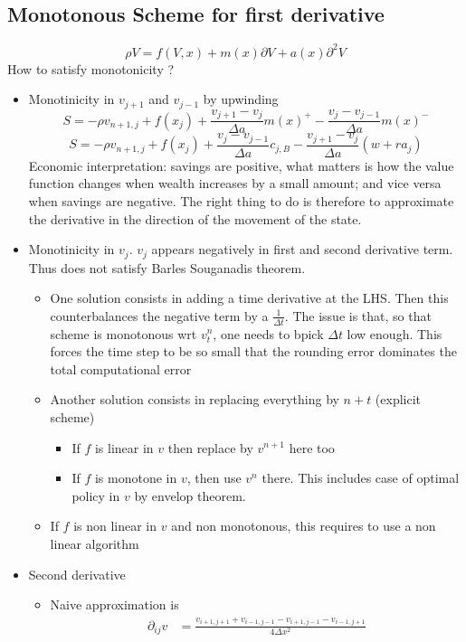 \documentclass[english]{article}
\begin{document}
\subsection{Monotonous Scheme for first derivative}
$$\rho V = f(V, x) + m(x) \partial V + a(x) \partial^2V$$ 
How to satisfy monotonicity ?
\begin{itemize}
	\item Monotinicity in $v_{j+1}$ and $v_{j-1}$ by upwinding
	$$S =-\rho v_{n+1, j} + f(x_j) + \frac{v_{j+1}-v_{j}}{\Delta a} m(x)^+ - \frac{v_j-v_{j-1}}{\Delta a} m(x)^-$$
	$$S =-\rho v_{n+1, j} + f(x_j) + \frac{v_j-v_{j-1}}{\Delta a} c_{j, B} - \frac{v_{j+1}-v_j}{\Delta a} (w + ra_j)$$
	Economic interpretation:  savings are positive, what matters is how the value function changes when wealth increases by a small amount; and vice versa when savings are negative. The right thing to do is therefore to approximate the derivative in the direction of the movement of the state.
	\item Monotinicity in $v_{j}$. $v_j$ appears negatively in first and second derivative term. Thus does not satisfy Barles Souganadis theorem.
	\begin{itemize}
		\item One solution consists in adding a time derivative at the LHS. Then this counterbalances the negative term by a $\frac{1}{\Delta t}$. 
		The issue is that, so that scheme is monotonous wrt $v^n_t$, one needs to bpick $\Delta t$ low enough. This forces the time step to be so small	that the rounding error dominates the total computational error
		\item Another solution consists in replacing everything by $n+t$ (explicit scheme)
		\begin{itemize}
			\item If $f$ is linear in $v$ then replace by $v^{n+1}$ here too
			\item If $f$ is monotone in $v$, then use $v^n$ there. This includes case of optimal policy in $v$ by envelop theorem.
		\end{itemize}
		\item If $f$ is non linear in $v$ and non monotonous, this requires to use a non linear algorithm
	\end{itemize}
	\item Second derivative
	\begin{itemize}
		\item Naive approximation is
		\begin{align*}
			\partial_{ij}v&=\frac{v_{i+1, j+1} + v_{i-1, j-1} - v_{i+1, j-1} - v_{i-1, j+1}}{4\Delta x^2}

\end{align*}
\end{itemize}
\end{itemize}
\end{document}
